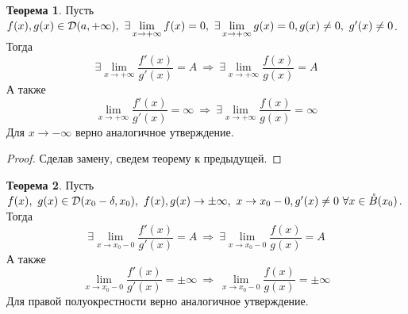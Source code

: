 \documentclass[a4paper, 12pt]{article}
\theoremstyle{definition}
\newtheorem*{theorem}{Теорема}
\begin{document}
        \begin{theorem}
            Пусть $f(x), g(x)\in \mathcal{D}(a,+\infty),\ \exists \lim\limits_{x\to +\infty}f(x)=0,\ \exists \lim\limits_{x\to +\infty}g(x)=0,\\
            g(x)\ne 0,\ g'(x)\ne 0$. Тогда
            \[\exists \lim\limits_{x\to +\infty}\frac{f'(x)}{g'(x)}=A\ \Rightarrow\ \exists \lim\limits_{x\to +\infty}\frac{f(x)}{g(x)}=A\]
            А также
            \[\lim\limits_{x\to +\infty}\frac{f'(x)}{g'(x)}=\infty\ \Rightarrow\ \exists \lim\limits_{x\to +\infty}\frac{f(x)}{g(x)}=\infty\]
            Для $x\to -\infty$ верно аналогичное утверждение.
        \end{theorem} 
        \begin{proof}
            Сделав замену, сведем теорему к предыдущей.
        \end{proof} 
        \begin{theorem}
            Пусть $f(x),\ g(x)\in \mathcal{D}(x_0-\delta, x_0),\ f(x),g(x)\to \pm \infty,\ x\to x_0-0,\\
            g'(x)\ne 0\ \forall x\in \mathring{B}(x_0)$. Тогда
            \[\exists \lim\limits_{x\to x_0-0}\frac{f'(x)}{g'(x)}=A\ \Rightarrow\ \exists \lim\limits_{x\to x_0-0}\frac{f(x)}{g(x)}=A\]
            А также
            \[\lim\limits_{x\to x_0-0}\frac{f'(x)}{g'(x)}=\pm \infty\ \Rightarrow\ \lim\limits_{x\to x_0-0}\frac{f(x)}{g(x)}=\pm \infty\]
            Для правой полуокрестности верно аналогичное утверждение.
        \end{theorem} 
\end{document}
